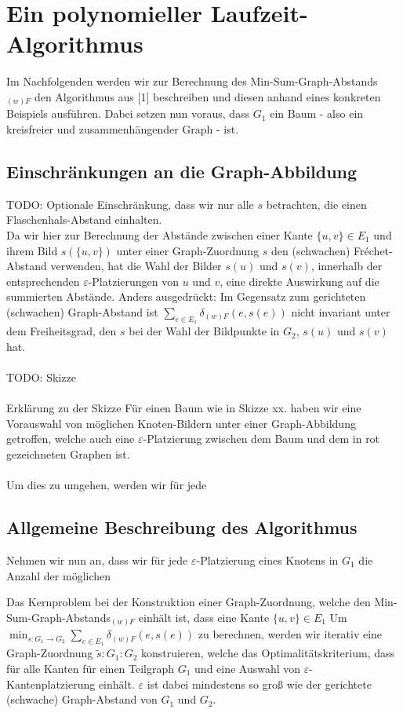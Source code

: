 \documentclass[a4paper, 12pt, twoside]{article}
\theoremstyle{Format1} %
\begin{document}
\section{Ein polynomieller Laufzeit-Algorithmus}

Im Nachfolgenden werden wir zur Berechnung des Min-Sum-Graph-Abstands$_{(w)F}$ den Algorithmus aus [1] beschreiben und diesen anhand eines konkreten Beispiels ausführen.
Dabei setzen nun voraus, dass $G_1$ ein Baum - also ein kreisfreier und zusammenhängender Graph - ist.

\subsection{Einschränkungen an die Graph-Abbildung}
TODO: Optionale Einschränkung, dass wir nur alle $s$ betrachten, die einen Flaschenhals-Abstand einhalten.
\\
Da wir hier zur Berechnung der Abstände zwischen einer Kante $\{u,v\} \in E_1$ und ihrem Bild $s(\{u,v\})$ unter einer Graph-Zuordnung $s$ den (schwachen) Fréchet-Abstand verwenden,
hat die Wahl der Bilder $s(u)$ und $s(v)$, innerhalb der entsprechenden $\varepsilon$-Platzierungen von $u$ und $v$, eine direkte Auswirkung auf die summierten Abstände.
Anders ausgedrückt: Im Gegensatz zum gerichteten (schwachen) Graph-Abstand ist $\sum_{e \in E_1}\delta_{(w)F}(e, s(e))$ nicht invariant unter dem Freiheitsgrad, den $s$
bei der Wahl der Bildpunkte in $G_2$, $s(u)$ und $s(v)$ hat.
\\
\\
TODO: Skizze
\\
\\
Erklärung zu der Skizze
Für einen Baum wie in Skizze xx. haben wir eine Vorauswahl von möglichen Knoten-Bildern unter einer Graph-Abbildung getroffen, welche auch eine
$\varepsilon$-Platzierung zwischen dem Baum und dem in rot gezeichneten Graphen ist.
\\
\\
Um dies zu umgehen, werden wir für jede


\subsection{Allgemeine Beschreibung des Algorithmus}
Nehmen wir nun an, dass wir für jede $\varepsilon$-Platzierung eines Knotens in $G_1$ die Anzahl der möglichen

Das Kernproblem bei der Konstruktion einer Graph-Zuordnung, welche den Min-Sum-Graph-Abstands$_{(w)F}$ einhält ist, dass eine Kante $\{u,v\} \in E_1$
Um $ \min_{s: G_1 \to G_2} \sum_{e \in E_1} \delta_{(w)F}(e, s(e))$ zu berechnen, werden wir iterativ eine Graph-Zuordnung $\tilde{s}: G_1: G_2$ konstruieren,
welche das Optimalitätskriterium, dass für alle Kanten für einen Teilgraph $G_1$ und eine Auswahl von $\varepsilon$-Kantenplatzierung einhält.
$\varepsilon$ ist dabei mindestens so groß wie der gerichtete (schwache) Graph-Abstand von $G_1$ und $G_2$.
\end{document}
